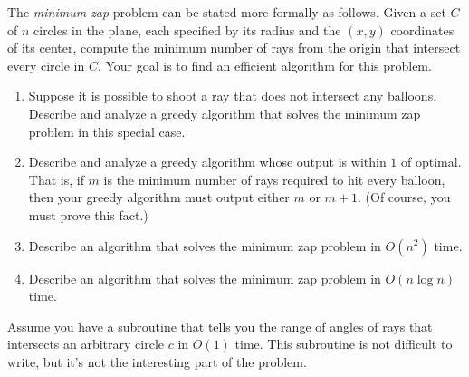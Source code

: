 \begin{exercises}
The \textit{minimum zap} problem can be stated more formally as follows. Given a set $C$ of $n$ circles in the plane, each specified by its radius and the $(x, y)$ coordinates of its center, compute the minimum number of rays from the origin that intersect every circle in $C$. Your goal is to find an efficient algorithm for this problem.
\begin{enumerate}[label=(\alph*)]
\item Suppose it is possible to shoot a ray that does not intersect any balloons. Describe and analyze a greedy algorithm that solves the minimum zap problem in this special case. 
\item Describe and analyze a greedy algorithm whose output is within $1$ of optimal. That is, if $m$ is the minimum number of rays required to hit every balloon, then your greedy algorithm must output either $m$ or $m+1$. (Of course, you must prove this fact.)
\item Describe an algorithm that solves the minimum zap problem in $O(n^2)$ time.
\item {}Describe an algorithm that solves the minimum zap problem in $O(n \log n)$ time.
\end{enumerate}
Assume you have a subroutine that tells you the range of angles of rays that intersects an arbitrary circle $c$ in $O(1)$ time. This subroutine is not difficult to write, but it’s not the interesting part of the problem.
\end{exercises}
